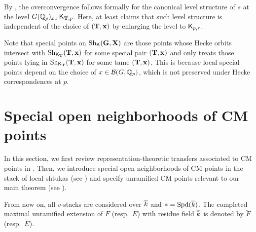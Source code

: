 \documentclass[12pt,reqno]{amsart}
\begin{document}
\begin{rmk}
    By , the overconvergence follows formally for the canonical level structure of $s$ at the level $G(\mathbb{Q}_p)_{x, r} {\mathsf{K}}_{\mathbf{T}, p}$. Here,  at least claims that such level structure is independent of the choice of $(\mathbf{T}, \mathbf{x})$ by enlarging the level to ${\mathsf{K}}_{p, r}$. 
\end{rmk}

Note that special points on ${\operatorname{Sh}}_{{\mathsf{K}}}(\mathbf{G}, \mathbf{X})$ are those points whose Hecke orbits intersect with ${\operatorname{Sh}}_{{\mathsf{K}}_{\mathbf{T}}}(\mathbf{T}, \mathbf{x})$ for some special pair $(\mathbf{T}, \mathbf{x})$ and  only treats those points lying in ${\operatorname{Sh}}_{{\mathsf{K}}_{\mathbf{T}}}(\mathbf{T}, \mathbf{x})$ for some tame $(\mathbf{T}, \mathbf{x})$. This is because local special points depend on the choice of $x \in {\mathcal{B}}(G, \mathbb{Q}_p)$, which is not preserved under Hecke correspondences at $p$. 

\section{Special open neighborhoods of CM points} \label{sec:special_open_neighborhoods}


In this section, we first review representation-theoretic transfers associated to CM points in . Then, we introduce special open neighborhoods of CM points in the stack of local shtukas (see ) and specify unramified CM points relevant to our main theorem (see ). 

From now on, all $v$-stacks are considered over ${\overline{k}}$ and $\ast = {\operatorname{Spd}}({\overline{k}})$. The completed maximal unramified extension of $F$ (resp.\ $E$) with residue field ${\overline{k}}$ is denoted by $\breve{F}$ (resp.\ $\breve{E}$). 
\end{document}
